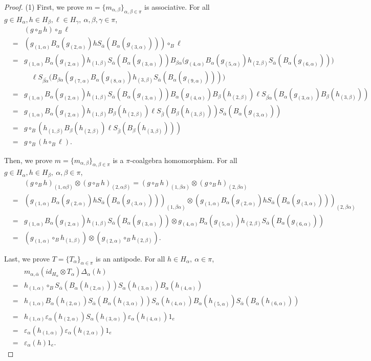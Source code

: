 \documentclass[11pt]{article}
\def\a{\alpha}
\def\b{\beta}
\def\g{\gamma}
\def\v{\varepsilon}
\begin{document}
\begin{proof}
(1) First, we prove $m=\{m_{\a,\b}\}_{\a,\b\in\pi}$ is  associative. For all $g\in H_\a, h\in H_\b, \ell\in H_\g, ~\a,\b,\g\in\pi$,
\begin{eqnarray*}
& & (g\circ_B h) \circ_B\ell \\
&=& (g_{(1,\a)}B_\a(g_{(2,\a)})hS_{\bar{\a}}(B_\a(g_{(3,\a)}))) \circ_B\ell \\
&=& g_{(1,\a)}B_\a(g_{(2,\a)})h_{(1,\b)}S_{\bar{\a}}(B_\a(g_{(3,\a)}))  B_{\b\a}\big( g_{(4,\a)} B_\a(g_{(5,\a)})h_{(2,\b)}S_{\bar{\a}}(B_\a(g_{(6,\a)})) \big) \\
&&\quad \ell S_{\bar{\b\a}}\big(B_{\b\a}( g_{(7,\a)} B_\a(g_{(8,\a)})h_{(3,\b)}S_{\bar{\a}}(B_\a(g_{(9,\a)})) )\big) \\
&=& g_{(1,\a)}B_\a(g_{(2,\a)})h_{(1,\b)}S_{\bar{\a}}(B_\a(g_{(3,\a)}))  B_\a(g_{(4,\a)})   B_\b(h_{(2,\b)})\ell  S_{\bar{\b\a}}( B_\a(g_{(3,\a)}) B_\b(h_{(3,\b)}) ) \\
&=& g_{(1,\a)}B_\a(g_{(2,\a)})h_{(1,\b)} B_\b(h_{(2,\b)})\ell S_{\bar{\b}}(B_\b(h_{(3,\b)})) S_{\bar{\a}}(B_\a(g_{(3,\a)})) \\
&=& g\circ_B( h_{(1,\b)} B_\b(h_{(2,\b)})\ell S_{\bar{\b}}(B_\b(h_{(3,\b)})) ) \\
&=& g\circ_B(h\circ_B \ell).
\end{eqnarray*}



  Then, we prove $m=\{m_{\a,\b}\}_{\a,\b\in\pi}$ is a $\pi$-coalgebra homomorphism. For all $g\in H_\a, h\in H_\b, ~\a,\b\in\pi$,
\begin{eqnarray*}
& & (g\circ_B h)_{(1,\a\b)} \otimes (g\circ_B h)_{(2,\a\b)} = (g\circ_B h)_{(1,\b\a)} \otimes (g\circ_B h)_{(2,\b\a)} \\
&=& (g_{(1,\a)}B_\a(g_{(2,\a)})hS_{\bar{\a}}(B_\a(g_{(3,\a)})))_{(1,\b\a)} \otimes (g_{(1,\a)}B_\a(g_{(2,\a)})hS_{\bar{\a}}(B_\a(g_{(3,\a)})))_{(2,\b\a)}  \\
&=& g_{(1,\a)}B_\a(g_{(2,\a)})h_{(1,\b)}S_{\bar{\a}}(B_\a(g_{(3,\a)})) \otimes g_{(4,\a)}B_\a(g_{(5,\a)})h_{(2,\b)}S_{\bar{\a}}(B_\a(g_{(6,\a)}))  \\
&=& (g_{(1,\a)}\circ_B h_{(1,\b)})\otimes(g_{(2,\a)}\circ_B h_{(2,\b)}).
\end{eqnarray*}

  Last, we prove $T=\{T_\a\}_{\a\in\pi}$ is an antipode. For all $h\in H_\a, ~\a\in\pi$,
\begin{eqnarray*}
& & m_{\a,\bar{\a}}(id_{H_{\a}} \otimes T_\a)\Delta_\a(h) \\
&=& h_{(1,\a)} \circ_B S_{\bar{\a}}(B_\a(h_{(2,\a)}))S_\a(h_{(3,\a)})B_\a(h_{(4,\a)}) \\
&=& h_{(1,\a)}B_\a(h_{(2,\a)}) S_{\bar{\a}}(B_\a(h_{(3,\a)}))S_\a(h_{(4,\a)})B_\a(h_{(5,\a)}) S_{\bar{\a}}(B_\a(h_{(6,\a)})) \\
&=& h_{(1,\a)} \v_\a(h_{(2,\a)}) S_\a(h_{(3,\a)}) \v_\a(h_{(4,\a)}) 1_e \\
&=& \v_\a(h_{(1,\a)}) \v_\a(h_{(2,\a)}) 1_e \\
&=& \v_\a(h)1_e.
\end{eqnarray*}


\end{proof}
\end{document}
